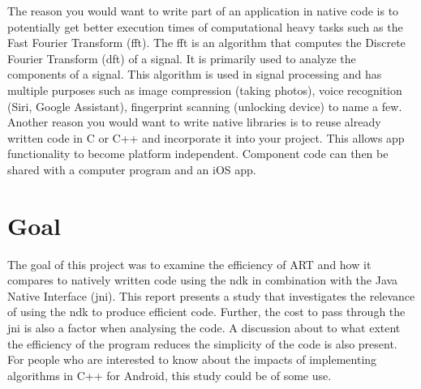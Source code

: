 The reason you would want to write part of an application in native code is to potentially get better execution times of computational heavy tasks such as the Fast Fourier Transform (\gls{fft}). The \gls{fft} is an algorithm that computes the Discrete Fourier Transform (\gls{dft}) of a signal. It is primarily used to analyze the components of a signal. This algorithm is used in signal processing and has multiple purposes such as image compression (taking photos), voice recognition (Siri, Google Assistant), fingerprint scanning (unlocking device) to name a few. Another reason you would want to write native libraries is to reuse already written code in C or C++ and incorporate it into your project. This allows app functionality to become platform independent. Component code can then be shared with a computer program and an iOS app.


\section{Goal}
The goal of this project was to examine the efficiency of ART and how it compares to natively written code using the \gls{ndk} in combination with the Java Native Interface (\gls{jni}). This report presents a study that investigates the relevance of using the \gls{ndk} to produce efficient code. Further, the cost to pass through the \gls{jni} is also a factor when analysing the code. A discussion about to what extent the efficiency of the program reduces the simplicity of the code is also present. For people who are interested to know about the impacts of implementing algorithms in C++ for Android, this study could be of some use.

